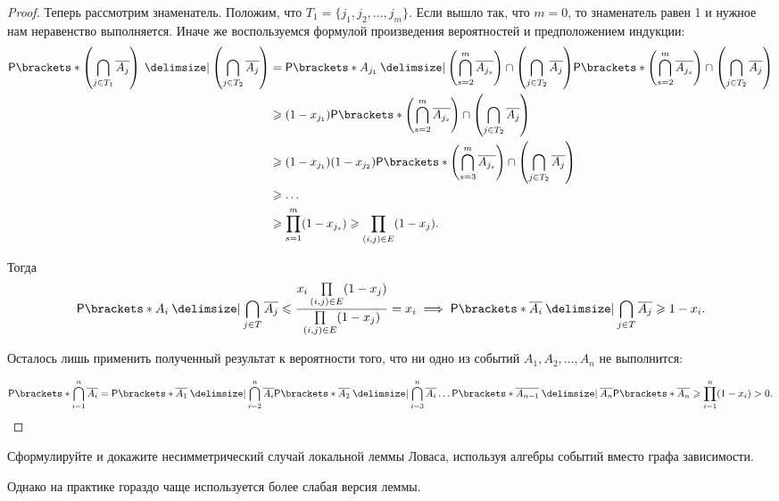 \begin{proof}
    Теперь рассмотрим знаменатель. Положим, что \(T_1 = \{j_{1}, j_{2}, \dots, j_{m}\}\). Если вышло так, что \(m = 0\), то знаменатель равен 1 и нужное нам неравенство выполняется. Иначе же воспользуемся формулой произведения вероятностей и предположением индукции:
    \[\begin{aligned}
    \Pr{\left(\bigcap\limits_{j \in T_1} \overline{A_j}\right) \given \left(\bigcap\limits_{j \in T_2} \overline{A_j}\right)} &= \Pr{A_{j_1} \given \left(\bigcap\limits_{s = 2}^{m}\overline{A_{j_s}}\right) \cap \left(\bigcap\limits_{j \in T_2} \overline{A_j}\right)}\Pr{\left(\bigcap\limits_{s = 2}^{m}\overline{A_{j_s}}\right) \cap \left(\bigcap\limits_{j \in T_2} \overline{A_j}\right)} \\
    &\geq (1 - x_{j_1})\Pr{\left(\bigcap\limits_{s = 2}^{m}\overline{A_{j_s}}\right) \cap \left(\bigcap\limits_{j \in T_2} \overline{A_j}\right)} \\
    &\geq (1 - x_{j_1})(1 - x_{j_2})\Pr{\left(\bigcap\limits_{s = 3}^{m}\overline{A_{j_s}}\right) \cap \left(\bigcap\limits_{j \in T_2} \overline{A_j}\right)} \\
    &\geq \dots \\
    &\geq \prod_{s = 1}^{m} (1 - x_{j_s}) \geq \prod\limits_{(i, j) \in E} (1 - x_j).
    \end{aligned}\]
    
    Тогда
    \[\Pr{A_i \given \bigcap_{j \in T} \overline{A_j}} \leq \frac{x_i \prod\limits_{(i, j) \in E} (1 - x_j)}{\prod\limits_{(i, j) \in E} (1 - x_j)} = x_i \implies \Pr{\overline{A_i} \given \bigcap_{j \in T} \overline{A_j}} \geq 1 - x_i.\]
    
    Осталось лишь применить полученный результат к вероятности того, что ни одно из событий \(A_1, A_2, \dots, A_n\) не выполнится:
    
    \[\Pr{\bigcap\limits_{i = 1}^{n} \overline{A_i}} = \Pr{\overline{A_1} \given \bigcap\limits_{i = 2}^{n} \overline{A_i}}\Pr{\overline{A_2} \given \bigcap\limits_{i = 3}^{n} \overline{A_i}}\dotsc\Pr{\overline{A_{n - 1}} \given \overline{A_n}}\Pr{\overline{A_n}} \geq \prod\limits_{i = 1}^{n}(1 - x_i) > 0. \qedhere\]
\end{proof}
\begin{exercise}
    Сформулируйте и докажите несимметрический случай локальной леммы Ловаса, используя алгебры событий вместо графа зависимости.
\end{exercise}

Однако на практике гораздо чаще используется более слабая версия леммы.

